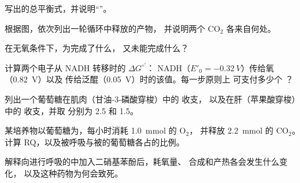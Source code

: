 \begin{exercise}[$\star$]\label{exo:b1:respiration-fermentation:2}
写出的总平衡式，并说明“”。
\end{exercise}

\begin{exercise}[$\star$]\label{exo:b1:respiration-fermentation:3}
根据图，依次列出一轮循环中释放的产物，
并说明两个 $\mathrm{CO_2}$ 各来自何处。
\end{exercise}

\begin{exercise}[$\star$]\label{exo:b1:respiration-fermentation:4}
在无氧条件下，为完成了什么，
又未能完成什么？
\end{exercise}

\begin{exercise}[$\star\star$]\label{exo:b1:respiration-fermentation:5}
计算两个电子从 NADH 转移时的 $\Delta G^{\circ\prime}$：
NADH（$E'_0 = \qty{-0.32}{V}$）传给氧（\qty{+0.82}{V}）以及
传给泛醌（\qty{+0.05}{V}）时的该值。每一步原则上
可支付多少个 ？
\end{exercise}

\begin{exercise}[$\star\star$]\label{exo:b1:respiration-fermentation:6}
列出一个葡萄糖在肌肉（甘油-3-磷酸穿梭）中的  收支，
以及在肝（苹果酸穿梭）中的  收支，并取 分别为 2.5 和 1.5。
\end{exercise}

\begin{exercise}[$\star\star$]\label{exo:b1:respiration-fermentation:7}
某培养物以葡萄糖为，每小时消耗 \qty{1.0}{mmol} 的 $\mathrm{O_2}$，
并释放 \qty{2.2}{mmol} 的 $\mathrm{CO_2}$。计算
RQ，以及被呼吸与被的葡萄糖各占的比例。
\end{exercise}

\begin{exercise}[$\star\star$]\label{exo:b1:respiration-fermentation:8}
解释向进行呼吸的中加入二硝基苯酚后，耗氧量、
 合成和产热各会发生什么变化，
以及这种药物为何会致死。
\end{exercise}

